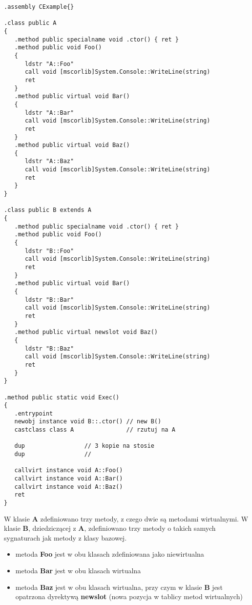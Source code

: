 \begin{scriptsize}
\begin{verbatim}
.assembly CExample{}  

.class public A
{
   .method public specialname void .ctor() { ret }
   .method public void Foo()
   {
      ldstr "A::Foo"
      call void [mscorlib]System.Console::WriteLine(string)
      ret
   }
   .method public virtual void Bar()
   {
      ldstr "A::Bar"
      call void [mscorlib]System.Console::WriteLine(string)
      ret
   }
   .method public virtual void Baz()
   {
      ldstr "A::Baz"
      call void [mscorlib]System.Console::WriteLine(string)
      ret
   }
}

.class public B extends A
{
   .method public specialname void .ctor() { ret }
   .method public void Foo()
   {
      ldstr "B::Foo"
      call void [mscorlib]System.Console::WriteLine(string)
      ret
   }
   .method public virtual void Bar()
   {
      ldstr "B::Bar"
      call void [mscorlib]System.Console::WriteLine(string)
      ret
   }
   .method public virtual newslot void Baz()
   {
      ldstr "B::Baz"
      call void [mscorlib]System.Console::WriteLine(string)
      ret
   }
}

.method public static void Exec()
{
   .entrypoint
   newobj instance void B::.ctor() // new B()
   castclass class A               // rzutuj na A

   dup                 // 3 kopie na stosie
   dup                 // 

   callvirt instance void A::Foo()
   callvirt instance void A::Bar()
   callvirt instance void A::Baz()
   ret
}
\end{verbatim}
\end{scriptsize}

W klasie {\bf A} zdefiniowano trzy metody, z czego dwie są metodami wirtualnymi. W klasie {\bf B}, dziedziczącej
z {\bf A}, zdefiniowano trzy metody o takich samych sygnaturach jak metody z klasy bazowej. 

\begin{itemize}
\item metoda {\bf Foo} jest w obu klasach zdefiniowana jako niewirtualna
\item metoda {\bf Bar} jest w obu klasach wirtualna
\item metoda {\bf Baz} jest w obu klasach wirtualna, przy czym w klasie {\bf B} jest opatrzona dyrektywą 
{\bf newslot} (nowa pozycja w tablicy metod wirtualnych)
\end{itemize}

